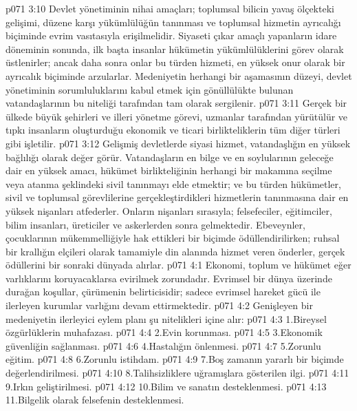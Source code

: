 \vs p071 3:10 Devlet yönetiminin nihai amaçları; toplumsal bilicin yavaş ölçekteki gelişimi, düzene karşı yükümlülüğün tanınması ve toplumsal hizmetin ayrıcalığı biçiminde evrim vasıtasıyla erişilmelidir. Siyaseti çıkar amaçlı yapanların idare döneminin sonunda, ilk başta insanlar hükümetin yükümlülüklerini görev olarak üstlenirler; ancak daha sonra onlar bu türden hizmeti, en yüksek onur olarak bir ayrıcalık biçiminde arzularlar. Medeniyetin herhangi bir aşamasının düzeyi, devlet yönetiminin sorumluluklarını kabul etmek için gönüllülükte bulunan vatandaşlarının bu niteliği tarafından tam olarak sergilenir.
\vs p071 3:11 Gerçek bir ülkede büyük şehirleri ve illeri yönetme görevi, uzmanlar tarafından yürütülür ve tıpkı insanların oluşturduğu ekonomik ve ticari birlikteliklerin tüm diğer türleri gibi işletilir.
\vs p071 3:12 Gelişmiş devletlerde siyasi hizmet, vatandaşlığın en yüksek bağlılığı olarak değer görür. Vatandaşların en bilge ve en soylularının geleceğe dair en yüksek amacı, hükümet birlikteliğinin herhangi bir makamına seçilme veya atanma şeklindeki sivil tanınmayı elde etmektir; ve bu türden hükümetler, sivil ve toplumsal görevlilerine gerçekleştirdikleri hizmetlerin tanınmasına dair en yüksek nişanları atfederler. Onların nişanları sırasıyla; felsefeciler, eğitimciler, bilim insanları, üreticiler ve askerlerden sonra gelmektedir. Ebeveynler, çocuklarının mükemmelliğiyle hak ettikleri bir biçimde ödüllendirilirken; ruhsal bir krallığın elçileri olarak tamamiyle din alanında hizmet veren önderler, gerçek ödüllerini bir sonraki dünyada alırlar.
\vs p071 4:1 Ekonomi, toplum ve hükümet eğer varlıklarını koruyacaklarsa evirilmek zorundadır. Evrimsel bir dünya üzerinde durağan koşullar, çürümenin belirticisidir; sadece evrimsel hareket gücü ile ilerleyen kurumlar varlığını devam ettirmektedir.
\vs p071 4:2 Genişleyen bir medeniyetin ilerleyici eylem planı şu nitelikleri içine alır:
\vs p071 4:3 1.\bibnobreakspace Bireysel özgürlüklerin muhafazası.
\vs p071 4:4 2.\bibnobreakspace Evin korunması.
\vs p071 4:5 3.\bibnobreakspace Ekonomik güvenliğin sağlanması.
\vs p071 4:6 4.\bibnobreakspace Hastalığın önlenmesi.
\vs p071 4:7 5.\bibnobreakspace Zorunlu eğitim.
\vs p071 4:8 6.\bibnobreakspace Zorunlu istihdam.
\vs p071 4:9 7.\bibnobreakspace Boş zamanın yararlı bir biçimde değerlendirilmesi.
\vs p071 4:10 8.\bibnobreakspace Talihsizliklere uğramışlara gösterilen ilgi.
\vs p071 4:11 9.\bibnobreakspace Irkın geliştirilmesi.
\vs p071 4:12 10.\bibnobreakspace Bilim ve sanatın desteklenmesi.
\vs p071 4:13 11.\bibnobreakspace Bilgelik olarak felsefenin desteklenmesi.
